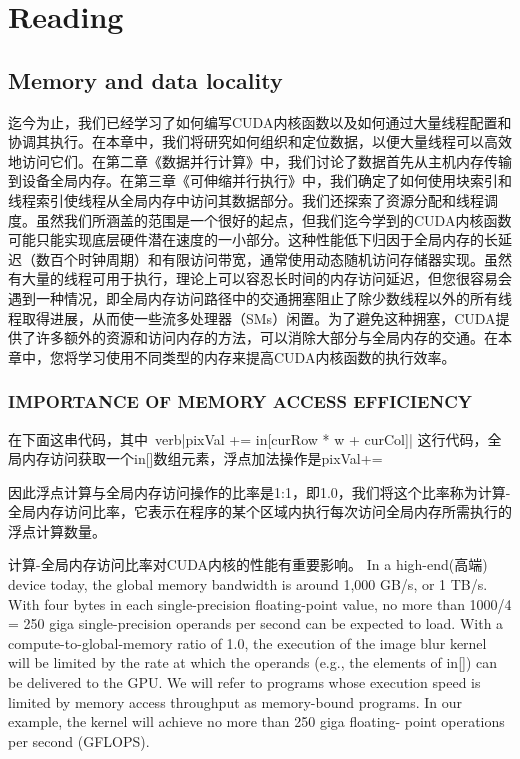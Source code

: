 \documentclass[11pt]{ctexart}
\begin{document}
\section{Reading}

\subsection{Memory and data locality}

迄今为止，我们已经学习了如何编写CUDA内核函数以及如何通过大量线程配置和协调其执行。在本章中，我们将研究如何组织和定位数据，以便大量线程可以高效地访问它们。在第二章《数据并行计算》中，我们讨论了数据首先从主机内存传输到设备全局内存。在第三章《可伸缩并行执行》中，我们确定了如何使用块索引和线程索引使线程从全局内存中访问其数据部分。我们还探索了资源分配和线程调度。虽然我们所涵盖的范围是一个很好的起点，但我们迄今学到的CUDA内核函数可能只能实现底层硬件潜在速度的一小部分。这种性能低下归因于全局内存的长延迟（数百个时钟周期）和有限访问带宽，通常使用动态随机访问存储器实现。虽然有大量的线程可用于执行，理论上可以容忍长时间的内存访问延迟，但您很容易会遇到一种情况，即全局内存访问路径中的交通拥塞阻止了除少数线程以外的所有线程取得进展，从而使一些流多处理器（SMs）闲置。为了避免这种拥塞，CUDA提供了许多额外的资源和访问内存的方法，可以消除大部分与全局内存的交通。在本章中，您将学习使用不同类型的内存来提高CUDA内核函数的执行效率。

\subsubsection{IMPORTANCE OF MEMORY ACCESS EFFICIENCY}

在下面这串代码，其中\ verb|pixVal += in[curRow * w + curCol]| 这行代码，全局内存访问获取一个in[]数组元素，浮点加法操作是pixVal+=

因此浮点计算与全局内存访问操作的比率是1:1，即1.0，我们将这个比率称为计算-全局内存访问比率，它表示在程序的某个区域内执行每次访问全局内存所需执行的浮点计算数量。

计算-全局内存访问比率对CUDA内核的性能有重要影响。
In a high-end(高端) device today, the global memory bandwidth is around 1,000 GB/s, or 1 TB/s. With four bytes in each single-precision
floating-point value, no more than 1000/4 = 250 giga single-precision operands per
second can be expected to load. With a compute-to-global-memory ratio of 1.0, the
execution of the image blur kernel will be limited by the rate at which the operands
(e.g., the elements of in[]) can be delivered to the GPU. We will refer to programs
whose execution speed is limited by memory access throughput as memory-bound
programs. In our example, the kernel will achieve no more than 250 giga floating-
point operations per second (GFLOPS).
\end{document}
